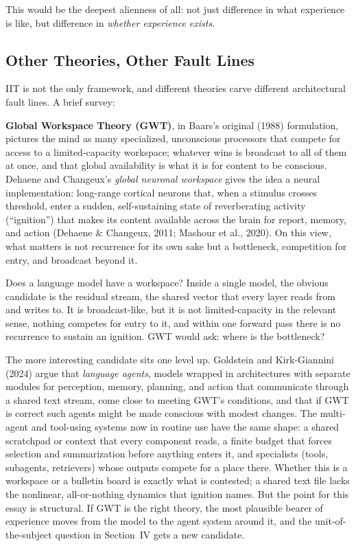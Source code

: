 \documentclass[11pt,letterpaper]{article}
\begin{document}
This would be the deepest alienness of all: not just difference in what experience is like, but difference in \emph{whether experience exists}.

\subsection{Other Theories, Other Fault Lines}

IIT is not the only framework, and different theories carve different architectural fault lines. A brief survey:

\textbf{Global Workspace Theory (GWT)}, in Baars's original (1988) formulation, pictures the mind as many specialized, unconscious processors that compete for access to a limited-capacity workspace; whatever wins is broadcast to all of them at once, and that global availability is what it is for content to be conscious. Dehaene and Changeux's \emph{global neuronal workspace} gives the idea a neural implementation: long-range cortical neurons that, when a stimulus crosses threshold, enter a sudden, self-sustaining state of reverberating activity (``ignition'') that makes its content available across the brain for report, memory, and action (Dehaene \& Changeux, 2011; Mashour et al., 2020). On this view, what matters is not recurrence for its own sake but a bottleneck, competition for entry, and broadcast beyond it.

Does a language model have a workspace? Inside a single model, the obvious candidate is the residual stream, the shared vector that every layer reads from and writes to. It is broadcast-like, but it is not limited-capacity in the relevant sense, nothing competes for entry to it, and within one forward pass there is no recurrence to sustain an ignition. GWT would ask: where is the bottleneck?

The more interesting candidate sits one level up. Goldstein and Kirk-Giannini (2024) argue that \emph{language agents}, models wrapped in architectures with separate modules for perception, memory, planning, and action that communicate through a shared text stream, come close to meeting GWT's conditions, and that if GWT is correct such agents might be made conscious with modest changes. The multi-agent and tool-using systems now in routine use have the same shape: a shared scratchpad or context that every component reads, a finite budget that forces selection and summarization before anything enters it, and specialists (tools, subagents, retrievers) whose outputs compete for a place there. Whether this is a workspace or a bulletin board is exactly what is contested; a shared text file lacks the nonlinear, all-or-nothing dynamics that ignition names. But the point for this essay is structural. If GWT is the right theory, the most plausible bearer of experience moves from the model to the agent system around it, and the unit-of-the-subject question in Section~IV gets a new candidate.
\end{document}

